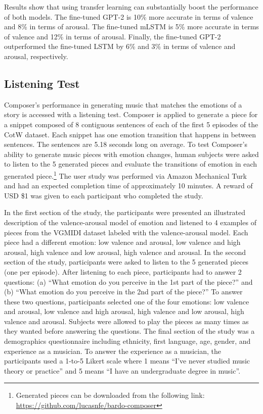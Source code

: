 Results show that using transfer learning can substantially boost the performance of both models. The fine-tuned GPT-2 is 10\% more accurate in terms of valence and 8\% in terms of arousal. The fine-tuned mLSTM is 5\% more accurate in terms of valence and 12\% in terms of arousal. Finally, the fine-tuned GPT-2 outperformed the fine-tuned LSTM by 6\% and 3\% in terms of valence and arousal, respectively.

\subsection{Listening Test}

Composer's performance in generating music that matches the emotions of a story is accessed with a listening test. Composer is applied to generate a piece for a snippet composed of 8 contiguous sentences of each of the first 5 episodes of the CotW dataset. Each snippet has one emotion transition that happens in between sentences. The sentences are 5.18 seconds long on average. To test Composer's ability to generate music pieces with emotion changes, human subjects were asked to listen to the 5 generated pieces and evaluate the transitions of emotion in each generated piece.\footnote{Generated pieces can be downloaded from the following link: \url{https://github.com/lucasnfe/bardo-composer}} The user study was performed via Amazon Mechanical Turk and had an expected completion time of approximately 10 minutes. A reward of USD \$1 was given to each participant who completed the study.

In the first section of the study, the participants were presented an illustrated description of the valence-arousal model of emotion and listened to 4 examples of pieces from the VGMIDI dataset labeled with the valence-arousal model. Each piece had a different emotion: low valence and arousal, low valence and high arousal, high valence and low arousal, high valence and arousal. In the second section of the study, participants were asked to listen to the 5 generated pieces (one per episode). After listening to each piece, participants had to answer 2 questions: (a) ``What emotion do you perceive in the 1st part of the piece?'' and (b) ``What emotion do you perceive in the 2nd part of the piece?'' To answer these two questions, participants selected one of the four emotions: low valence and arousal, low valence and high arousal, high valence and low arousal, high valence and arousal. Subjects were allowed to play the pieces as many times as they wanted before answering the questions.
The final section of the study was a demographics questionnaire including ethnicity, first language, age, gender, and experience as a musician. To answer the experience as a musician, the participants used a 1-to-5 Likert scale where 1 means ``I've never studied music theory or practice'' and 5 means ``I have an undergraduate degree in music''.

